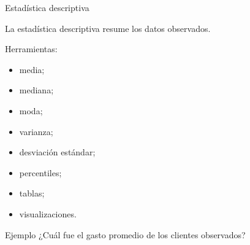 \documentclass[aspectratio=169,11pt]{beamer}
\begin{document}
\begin{frame}{Estadística descriptiva}

La estadística descriptiva resume los datos observados.

\vspace{0.3cm}

Herramientas:

\begin{itemize}

    \item media;

    \item mediana;

    \item moda;

    \item varianza;

    \item desviación estándar;

    \item percentiles;

    \item tablas;

    \item visualizaciones.

\end{itemize}

\vspace{0.4cm}

\begin{exampleblock}{Ejemplo}
¿Cuál fue el gasto promedio de los clientes observados?
\end{exampleblock}

\end{frame}

\end{document}
